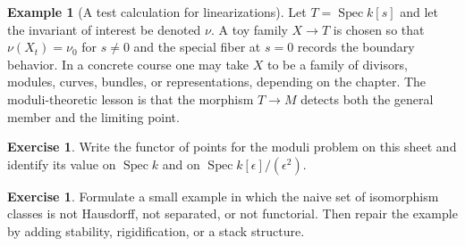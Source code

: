 \documentclass[11pt]{amsart}
\theoremstyle{definition}
\newtheorem{example}[theorem]{Example}
\newtheorem{exercise}[theorem]{Exercise}
\newcommand{\Spec}{\operatorname{Spec}}
\begin{document}
\begin{example}[A test calculation for linearizations]
Let $T=\Spec k[s]$ and let the invariant of interest be denoted $\nu$.  A toy family $X\to T$ is chosen so that $\nu(X_t)=\nu_0$ for $s\ne0$ and the special fiber at $s=0$ records the boundary behavior.  In a concrete course one may take $X$ to be a family of divisors, modules, curves, bundles, or representations, depending on the chapter.  The moduli-theoretic lesson is that the morphism $T\to M$ detects both the general member and the limiting point.
\end{example}
\begin{exercise}
Write the functor of points for the moduli problem on this sheet and identify its value on $\Spec k$ and on $\Spec k[\epsilon]/(\epsilon^2)$.
\end{exercise}
\begin{exercise}
Formulate a small example in which the naive set of isomorphism classes is not Hausdorff, not separated, or not functorial.  Then repair the example by adding stability, rigidification, or a stack structure.
\end{exercise}
\clearpage
\end{document}
